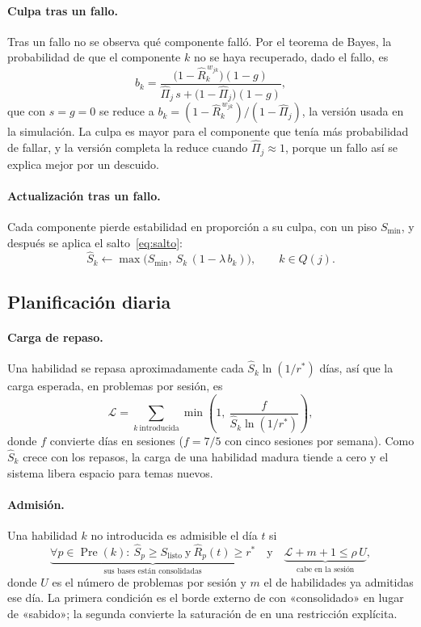 \documentclass[12pt]{article}
\theoremstyle{definition}
\newcommand{\Pre}{\operatorname{Pre}}
\newcommand{\Rh}{\hat R}
\newcommand{\Sh}{\hat S}
\newcommand{\Pih}{\hat\Pi}
\newcommand{\rstar}{r^{\ast}}
\newcommand{\Slisto}{S_{\mathrm{listo}}}
\newcommand{\Smin}{S_{\min}}
\newcommand{\Carga}{\mathcal L}
\begin{document}
\paragraph{Culpa tras un fallo.} Tras un fallo no se observa qué componente falló. Por el teorema de Bayes, la probabilidad de que el componente $k$ no se haya recuperado, dado el fallo, es
\begin{equation}
b_k=\frac{\bigl(1-\Rh_k^{\,w_{jk}}\bigr)(1-g)}{\Pih_j\,s+\bigl(1-\Pih_j\bigr)(1-g)},
\label{eq:culpa}
\end{equation}
que con $s=g=0$ se reduce a $b_k=(1-\Rh_k^{\,w_{jk}})/(1-\Pih_j)$, la versión usada en la simulación. La culpa es mayor para el componente que tenía más probabilidad de fallar, y la versión completa la reduce cuando $\Pih_j\approx1$, porque un fallo así se explica mejor por un descuido.

\paragraph{Actualización tras un fallo.} Cada componente pierde estabilidad en proporción a su culpa, con un piso $\Smin$, y después se aplica el salto~\eqref{eq:salto}:
\begin{equation}
\Sh_k\leftarrow\max\bigl(\Smin,\ \Sh_k\,(1-\lambda\,b_k)\bigr),\qquad k\in Q(j).
\label{eq:fallo}
\end{equation}

\subsection{Planificación diaria}

\paragraph{Carga de repaso.} Una habilidad se repasa aproximadamente cada $\Sh_k\ln(1/\rstar)$ días, así que la carga esperada, en problemas por sesión, es
\begin{equation}
\Carga=\sum_{k\ \text{introducida}}\min\!\left(1,\ \frac{f}{\Sh_k\ln(1/\rstar)}\right),
\label{eq:carga}
\end{equation}
donde $f$ convierte días en sesiones ($f=7/5$ con cinco sesiones por semana). Como $\Sh_k$ crece con los repasos, la carga de una habilidad madura tiende a cero y el sistema libera espacio para temas nuevos.

\paragraph{Admisión.} Una habilidad $k$ no introducida es admisible el día $t$ si
\begin{equation}
\underbrace{\forall p\in\Pre(k):\ \Sh_p\ge\Slisto\ \text{y}\ \Rh_p(t)\ge\rstar}_{\text{sus bases están consolidadas}}
\quad\text{y}\quad
\underbrace{\Carga+m+1\le\rho\,U}_{\text{cabe en la sesión}},
\label{eq:admision}
\end{equation}
donde $U$ es el número de problemas por sesión y $m$ el de habilidades ya admitidas ese día. La primera condición es el borde externo de \citet{doignon1985} con «consolidado» en lugar de «sabido»; la segunda convierte la saturación de \citet{reddy2016} en una restricción explícita.
\end{document}
